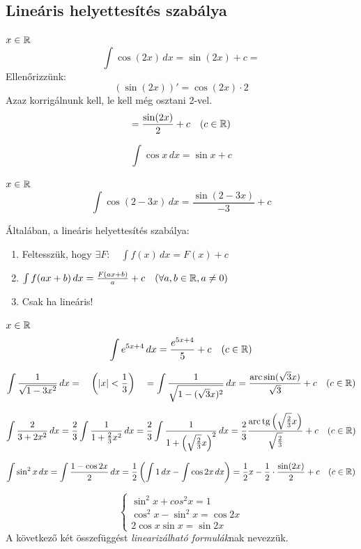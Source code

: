 \documentclass[a4paper,11.5pt]{article}
\DeclareMathOperator{\tg}{tg}
\DeclareMathOperator{\arc}{arc}
\begin{document}
	\subsection{Lineáris helyettesítés szabálya}
	\begin{task}$x\in\mathbb{R}$
		\[ \int\cos(2x)\,dx=\sin(2x)+c= \]
		Ellenőrizzünk:
		\[ (\sin(2x))'=\cos(2x)\cdot2 \]
		Azaz korrigálnunk kell, le kell még osztani 2-vel.
		\[ =\frac{\sin(2x)}{2}+c\quad (c\in\mathbb{R}) \]
	\end{task}
	\begin{revision}
		\[ \int\cos x\,dx=\sin x+c \]
	\end{revision}
	\begin{task}$x\in\mathbb{R}$
		\[ \int\cos(2-3x)\,dx=\frac{\sin(2-3x)}{-3}+c \]
	\end{task}
	Általában, a lineáris helyettesítés szabálya:
	\begin{enumerate}
		\item Feltesszük, hogy $\exists F:\quad \int f(x)\,dx=F(x)+c$
		\item $\int f(ax+b)\,dx=\frac{F(ax+b)}{a}+c\quad (\forall a,b\in\mathbb{R}, a\not=0)$
		\item Csak ha lineáris!
	\end{enumerate}
	\begin{task}$x\in\mathbb{R}$
		\[ \int e^{5x+4}\,dx=\frac{e^{5x+4}}{5}+c\quad (c\in\mathbb{R}) \]
	\end{task}
	\begin{task}
		\[ \int\frac{1}{\sqrt{1-3x^2}}\,dx=\quad \left(|x|<\frac{1}{3}\right) \quad =\int\frac{1}{\sqrt{1-(\sqrt{3}x)^2}}\,dx=\frac{\arc\sin(\sqrt{3}x)}{\sqrt{3}}+c\quad (c\in\R) \]
	\end{task}
	\begin{task}
		\[ \int\frac{2}{3+2x^2}\,dx=\frac{2}{3}\int\frac{1}{1+\frac{2}{3}x^2}\,dx=\frac{2}{3}\int\frac{1}{1+\left(\sqrt{\frac{2}{3}}x\right)^2}\,dx=\frac{2}{3}\frac{\arc\tg\left(\sqrt{\frac{2}{3}}x\right)}{\sqrt{\frac{2}{3}}}+c\quad (c\in\R) \]
	\end{task}
	\begin{task}
		\[\int\sin^2x\,dx=\int\frac{1-\cos2x}{2}\,dx=\frac{1}{2}\left(\int1\,dx-\int\cos2x\,dx\right)=\frac{1}{2}x-\frac{1}{2}\cdot\frac{\sin(2x)}{2}+c\quad (c\in\mathbb{R}) \]
	\end{task}
	\begin{note}
		\[ \begin{cases}
			\sin^2x+cos^2x=1\\
			\cos^2x-\sin^2x=\cos2x\\
			2\cos x\sin x=\sin2x
		\end{cases} \]
		A következő két összefüggést \textit{linearizálható formulák}nak nevezzük.
		\begin{center}
			\quad {}
		\end{center}
	\end{note}
\end{document}
